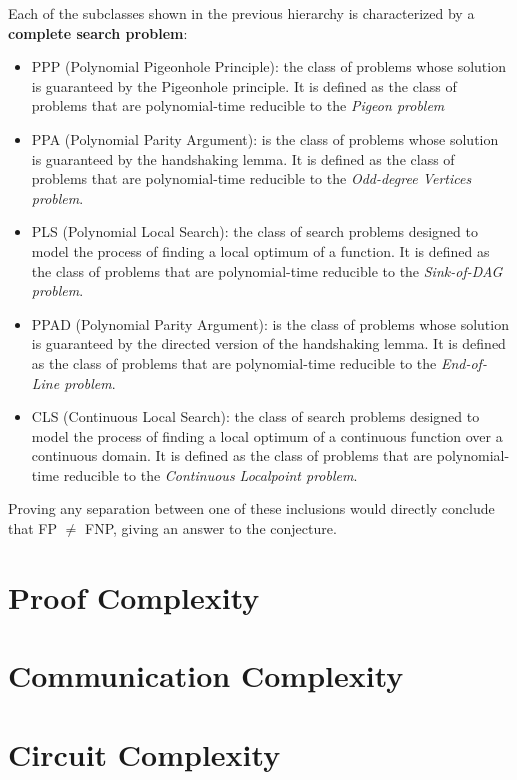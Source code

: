 Each of the subclasses shown in the previous hierarchy is characterized by a \textbf{complete search problem}:
\begin{itemize}
    \item \textsf{PPP} (Polynomial Pigeonhole Principle): the class of problems whose solution is guaranteed by the Pigeonhole principle. It is defined as the class of problems that are polynomial-time reducible to the \textit{Pigeon problem}
    
    
    \item \textsf{PPA} (Polynomial Parity Argument): is the class of problems whose solution is guaranteed by the handshaking lemma. It is defined as the class of problems that are polynomial-time reducible to the \textit{Odd-degree Vertices problem}.
    
    \item \textsf{PLS} (Polynomial Local Search): the class of search problems designed to model the process of finding a local optimum of a function. It is defined as the class of problems that are polynomial-time reducible to the \textit{Sink-of-DAG problem}.
    
    \item \textsf{PPAD} (Polynomial Parity Argument): is the class of problems whose solution is guaranteed by the directed version of the handshaking lemma. It is defined as the class of problems that are polynomial-time reducible to the \textit{End-of-Line problem}.
    
    
    \item \textsf{CLS} (Continuous Local Search): the class of search problems designed to model the process of finding a local optimum of a continuous function over a continuous domain. It is defined as the class of problems that are polynomial-time reducible to the \textit{Continuous Localpoint problem}.
\end{itemize}

Proving any separation between one of these inclusions would directly conclude that \textsf{FP} $\neq$ \textsf{FNP}, giving an answer to the conjecture.
 
\section{Proof Complexity}

\section{Communication Complexity}

\section{Circuit Complexity}

\cleardoublepage